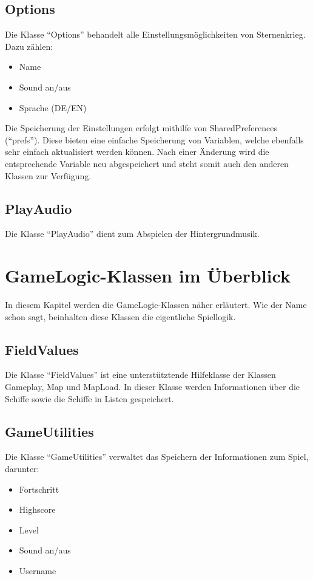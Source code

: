 \documentclass[11pt]{article} %
\begin{document}
\subsection{Options}
Die Klasse \enquote{Options} behandelt alle Einstellungsmöglichkeiten von Sternenkrieg. Dazu zählen:
\begin{itemize}
\item Name
\item Sound an/aus
\item Sprache (DE/EN)
\end{itemize}
Die Speicherung der Einstellungen erfolgt mithilfe von SharedPreferences (\enquote{prefs}). Diese bieten eine einfache Speicherung von Variablen, welche ebenfalls sehr einfach aktualisiert werden können. Nach einer Änderung wird die entsprechende Variable neu abgespeichert und steht somit auch den anderen Klassen zur Verfügung.

\subsection{PlayAudio}
Die Klasse \enquote{PlayAudio} dient zum Abspielen der Hintergrundmusik.

\section{GameLogic-Klassen im Überblick}
In diesem Kapitel werden die GameLogic-Klassen näher erläutert. Wie der Name schon sagt, beinhalten diese Klassen die eigentliche Spiellogik.

\subsection{FieldValues}
Die Klasse \enquote{FieldValues} ist eine unterstütztende Hilfeklasse der Klassen Gameplay, Map und MapLoad. In dieser Klasse werden Informationen über die Schiffe sowie die Schiffe in Listen gespeichert.

\subsection{GameUtilities}
Die Klasse \enquote{GameUtilities} verwaltet das Speichern der Informationen zum Spiel, darunter:
\begin{itemize}
\item Fortschritt
\item Highscore
\item Level
\item Sound an/aus
\item Username
\end{itemize}
\end{document}
